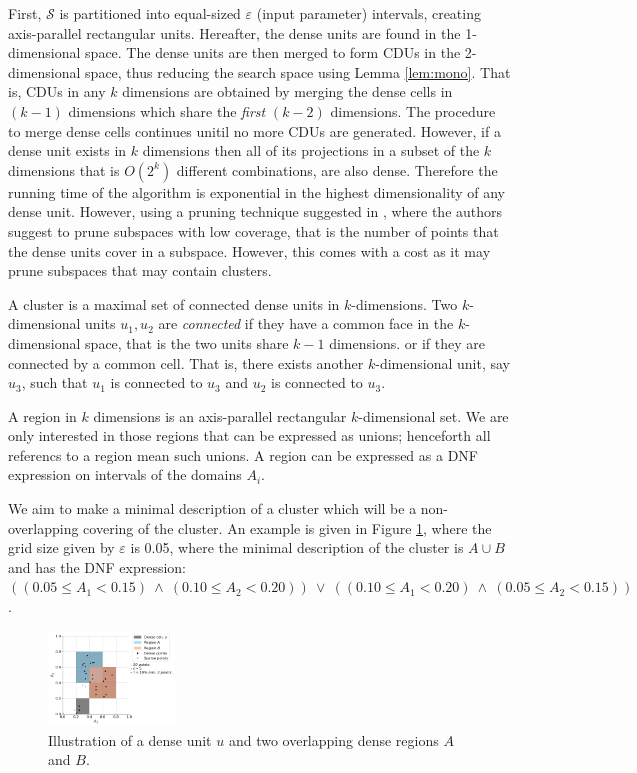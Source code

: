 First, $\mathcal{S}$ is partitioned into equal-sized $\varepsilon$ (input parameter) intervals, creating axis-parallel rectangular units. Hereafter, the dense units are found in the 1-dimensional space. The dense units are then merged to form CDUs in the 2-dimensional space, thus reducing the search space using Lemma \ref{lem:mono}. That is, CDUs in any $k$ dimensions are obtained by merging the dense cells in $(k-1)$ dimensions which share the \textit{first} $(k-2)$ dimensions. The procedure to merge dense cells continues unitil no more CDUs are generated. However, if a dense unit exists in $k$ dimensions then all of its projections in a subset of the $k$ dimensions that is $O(2^k)$ different combinations, are also dense. Therefore the running time of the algorithm is exponential in the highest dimensionality of any dense unit. However, using a pruning technique suggested in \cite{clique}, where the authors suggest to prune subspaces with low coverage, that is the number of points that the dense units cover in a subspace. However, this comes with a cost as it may prune subspaces that may contain clusters.

A cluster is a maximal set of connected dense units in $k$-dimensions. Two $k$-dimensional units $u_1, u_2$ are \textit{connected} if they have a common face in the $k$-dimensional space, that is the two units share $k-1$ dimensions. or if they are connected by a common cell. That is, there exists another $k$-dimensional unit, say $u_3$, such that $u_1$ is connected to $u_3$ and $u_2$ is connected to $u_3$.

A region in $k$ dimensions is an axis-parallel rectangular $k$-dimensional set. We are only interested in those regions that can be expressed as unions; henceforth all referencs to a region mean such unions. A region can be expressed as a DNF expression on intervals of the domains $A_i$.

We aim to make a minimal description of a cluster which will be a non-overlapping covering of the cluster. An example is given in Figure \ref{fig:dense_cells_and_regions}, where the grid size given by $\varepsilon$ is 0.05, where the minimal description of the cluster is $A \cup B$ and has the DNF expression: $((0.05 \le A_1 < 0.15) ~\wedge~ (0.10 \le A_2 < 0.20)) ~\vee~ ((0.10 \le A_1 < 0.20) ~\wedge~ (0.05 \le A_2 < 0.15))$.
\begin{figure}[H]
    \vspace*{-0.5cm}
    \centering
    \includegraphics[width=0.3\textwidth]{figures/dense_cells_and_regions.png}
    \caption{Illustration of a dense unit $u$ and two overlapping dense regions $A$ and $B$.}
    \label{fig:dense_cells_and_regions}
    \vspace*{-0.5cm}
\end{figure}


